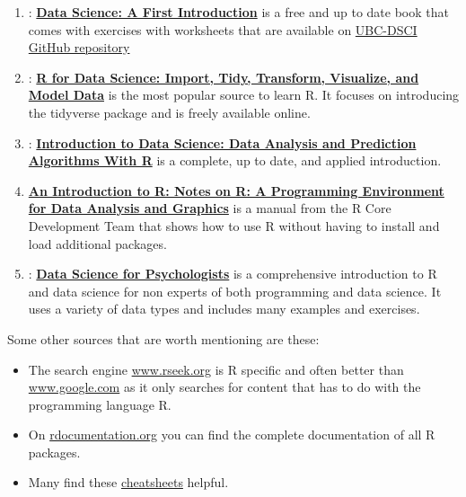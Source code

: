 \documentclass[
  12pt,
  oneside]{book}
\providecommand{\tightlist}{%
  \setlength{\itemsep}{0pt}\setlength{\parskip}{0pt}}
\begin{document}
\begin{enumerate}
\def\labelenumi{\arabic{enumi}.}
\tightlist
\item
  \citet{Timbers2022Data}: \href{https://datasciencebook.ca/}{\textbf{Data Science: A First Introduction}} is a free and up to date book that comes with exercises with worksheets that are available on \href{https://github.com/UBC-DSCI/data-science-a-first-intro-worksheets}{UBC-DSCI GitHub repository}
\item
  \citet{Wickham2023R}: \href{https://r4ds.hadley.nz/}{\textbf{R for Data Science: Import, Tidy, Transform, Visualize, and Model Data}} is the most popular source to learn R. It focuses on introducing the tidyverse package and is freely available online.
\item
  \citet{Irizarry2022Introduction}: \href{http://rafalab.dfci.harvard.edu/dsbook/}{\textbf{Introduction to Data Science: Data Analysis and Prediction Algorithms With R}} is a complete, up to date, and applied introduction.
\item
  \citet{Venables2022Introduction} \href{https://cran.r-project.org/doc/manuals/r-release/R-intro.pdf}{\textbf{An Introduction to R: Notes on R: A Programming Environment for Data Analysis and Graphics}} is a manual from the R Core Development Team that shows how to use R without having to install and load additional packages.
\item
  \citet{Neth2022ds4psy}: \href{https://bookdown.org/hneth/ds4psy/}{\textbf{Data Science for Psychologists}} is a comprehensive introduction to R and data science for non experts of both programming and data science. It uses a variety of data types and includes many examples and exercises.
\end{enumerate}

Some other sources that are worth mentioning are these:

\begin{itemize}
\tightlist
\item
  The search engine \href{http://www.rseek.org}{www.rseek.org} is R specific and often better than \href{http://www.google.com}{www.google.com} as it only searches for content that has to do with the programming language R.
\item
  On \href{http://www.rdocumentation.org}{rdocumentation.org} you can find the complete documentation of all R packages.
\item
  Many find these \href{https://posit.co/resources/cheatsheets/}{cheatsheets} helpful.
\end{itemize}
\end{document}

